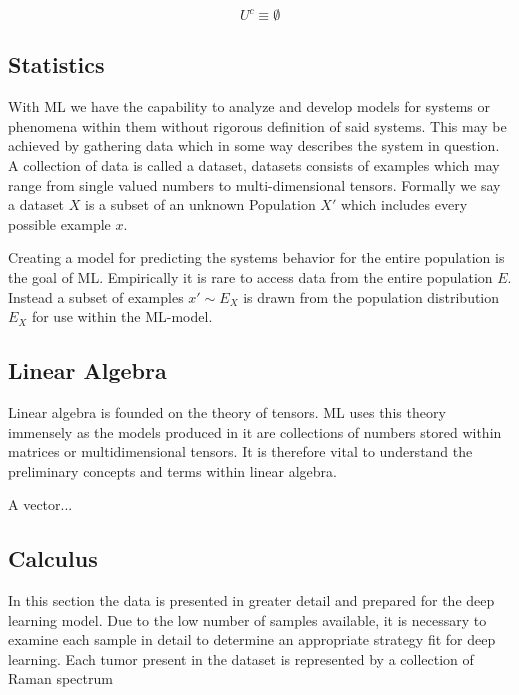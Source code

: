\begin{equation}
\label{eqnuniverseC}
U^c  \equiv \emptyset
\end{equation}



\subsection{Statistics}

With ML we have the capability to analyze and develop models for systems or phenomena within them without rigorous definition of said systems. This may be achieved by gathering data which in some way describes the system in question. A collection of data is called a dataset, datasets consists of examples which may range from single valued numbers to multi-dimensional tensors. Formally we say a dataset $X$ is a subset of an unknown Population $X'$ which includes every possible example $x$.


Creating a model for predicting the systems behavior for the entire population is the goal of ML. Empirically it is rare to access data from the entire population $E$. Instead a subset of examples $x' \sim E_{X}$ is drawn from the population distribution $E_{X}$ for use within the ML-model. 

\subsection{Linear Algebra}

Linear algebra is founded on the theory of tensors. ML uses this theory immensely as the models produced in it are collections of numbers stored within matrices or multidimensional tensors. It is therefore vital to understand the preliminary concepts and terms within linear algebra.

A vector...

\subsection{Calculus}



In this section the data is presented in greater detail and prepared for the deep learning model. Due to the low number of samples available, it is necessary to examine each sample in detail to determine an appropriate strategy fit for deep learning. Each tumor present in the dataset is represented by a collection of Raman spectrum


